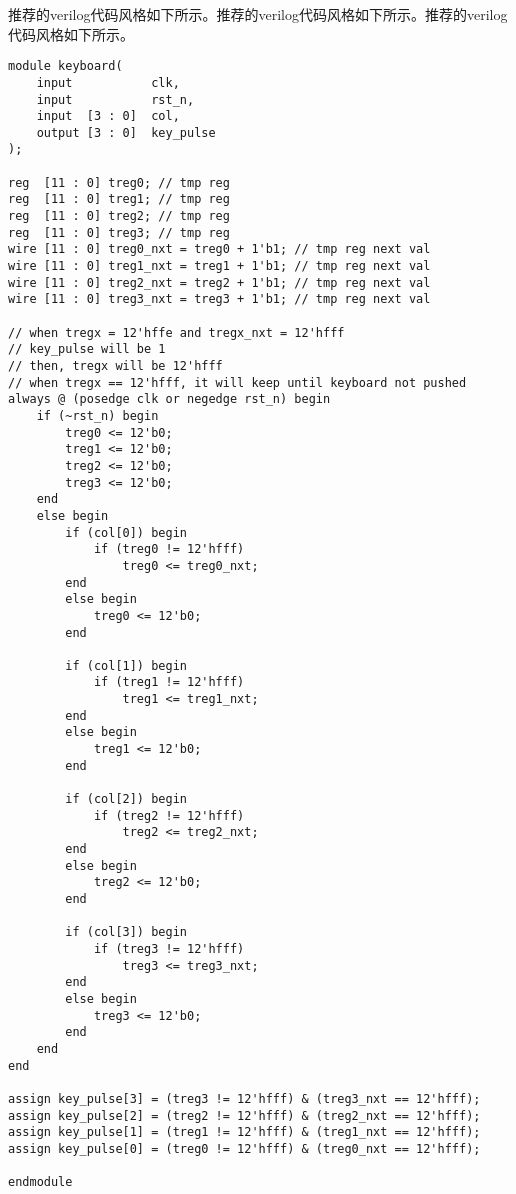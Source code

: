 
推荐的verilog代码风格如下所示。推荐的verilog代码风格如下所示。推荐的verilog代码风格如下所示。
\lstset{language=verilog}
\begin{lstlisting}
module keyboard(
    input           clk,
    input           rst_n,
    input  [3 : 0]  col,
    output [3 : 0]  key_pulse
);

reg  [11 : 0] treg0; // tmp reg
reg  [11 : 0] treg1; // tmp reg
reg  [11 : 0] treg2; // tmp reg
reg  [11 : 0] treg3; // tmp reg
wire [11 : 0] treg0_nxt = treg0 + 1'b1; // tmp reg next val
wire [11 : 0] treg1_nxt = treg1 + 1'b1; // tmp reg next val
wire [11 : 0] treg2_nxt = treg2 + 1'b1; // tmp reg next val
wire [11 : 0] treg3_nxt = treg3 + 1'b1; // tmp reg next val

// when tregx = 12'hffe and tregx_nxt = 12'hfff
// key_pulse will be 1
// then, tregx will be 12'hfff
// when tregx == 12'hfff, it will keep until keyboard not pushed
always @ (posedge clk or negedge rst_n) begin
    if (~rst_n) begin
        treg0 <= 12'b0;
        treg1 <= 12'b0;
        treg2 <= 12'b0;
        treg3 <= 12'b0;
    end
    else begin
        if (col[0]) begin 
            if (treg0 != 12'hfff) 
                treg0 <= treg0_nxt;
        end
        else begin
            treg0 <= 12'b0;
        end

        if (col[1]) begin
            if (treg1 != 12'hfff) 
                treg1 <= treg1_nxt;
        end
        else begin   
            treg1 <= 12'b0;
        end

        if (col[2]) begin
            if (treg2 != 12'hfff)
                treg2 <= treg2_nxt;
        end
        else begin
            treg2 <= 12'b0;
        end

        if (col[3]) begin
            if (treg3 != 12'hfff) 
                treg3 <= treg3_nxt;
        end
        else begin        
            treg3 <= 12'b0;
        end
    end
end

assign key_pulse[3] = (treg3 != 12'hfff) & (treg3_nxt == 12'hfff); 
assign key_pulse[2] = (treg2 != 12'hfff) & (treg2_nxt == 12'hfff);
assign key_pulse[1] = (treg1 != 12'hfff) & (treg1_nxt == 12'hfff);
assign key_pulse[0] = (treg0 != 12'hfff) & (treg0_nxt == 12'hfff);

endmodule
\end{lstlisting}